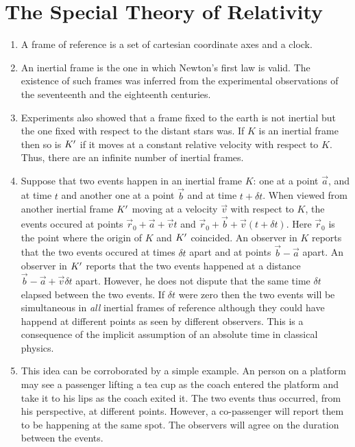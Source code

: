 \chapter{The Special Theory of Relativity}\label{c1}
\begin{enumerate}
\item A frame of reference is a set of cartesian coordinate axes and a clock.

\item An inertial frame is the one in which Newton's first law is valid. The 
existence of such frames was inferred from the experimental observations of the
seventeenth and the eighteenth centuries.

\item Experiments also showed that a frame fixed to the earth is not inertial
but the one fixed with respect to the distant stars was. If $K$ is an inertial
frame then so is $K^\prime$ if it moves at a constant relative velocity with respect
to $K$. Thus, there are an infinite number of inertial frames.

\item Suppose that two events happen in an inertial frame $K$: one at a point
$\vec{a}$, and at time $t$ and another one at a point $\vec{b}$ and at time 
$t + \delta t$. When viewed from another inertial frame $K^\prime$ moving at a 
velocity $\vec{v}$ with respect to $K$, the events occured at points $\vec{r}_0 
+ \vec{a} + \vec{v}t$ and $\vec{r}_0 + \vec{b} +\vec{v}(t + \delta t)$. Here 
$\vec{r}_0$ is the point where the origin of $K$ and $K^\prime$ coincided. An observer 
in $K$ reports that the two events occured at times $\delta t$ apart and at points 
$\vec{b} - \vec{a}$ apart. An observer in $K^\prime$ reports that the two events 
happened at a distance $\vec{b} - \vec{a} + \vec{v}\delta t$ apart. However, 
he does not dispute that the same time $\delta t$ elapsed between the two events. 
If $\delta t$ were zero then the two events will be simultaneous in \emph{all} 
inertial frames of reference although they could have happend at different 
points as seen by different observers. This is a consequence of the implicit 
assumption of an absolute time in classical physics.

\item This idea can be corroborated by a simple example. An person on a platform may
see a passenger lifting a tea cup as the coach entered the platform and take it
to his lips as the coach exited it. The two events thus occurred, from his 
perspective, at different points. However, a co-passenger will report them to
be happening at the same spot. The observers will agree on the duration between
the events.


\end{enumerate}
